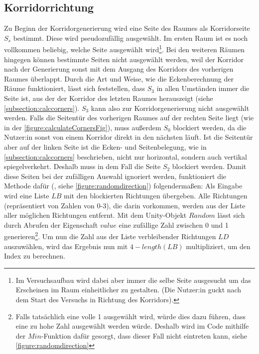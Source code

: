 \subsection{Korridorrichtung}

\begin{figure}[h!]
    \caption{}\label{figure:randomdirection}
\end{figure}
Zu Beginn der Korridorgenerierung wird eine Seite des Raumes als Korridorseite $S_s$ bestimmt. Diese wird pseudozufällig ausgewählt. Im ersten Raum ist es noch vollkommen beliebig, welche Seite ausgewählt wird\footnote{Im Versuchsaufbau wird dabei aber immer die selbe Seite ausgesucht um das Erscheinen im Raum einheitlicher zu gestalten. (Die Nutzer:in guckt nach dem Start des Versuchs in Richtung des Korridors).}.
Bei den weiteren Räumen hingegen können bestimmte Seiten nicht ausgewählt werden, weil der Korridor nach der Generierung sonst mit dem Ausgang des Korridors des vorherigen Raumes überlappt.
Durch die Art und Weise, wie die Eckenberechnung der Räume funktioniert, lässt sich feststellen, dass $S_3$ in allen Umständen immer die Seite ist, aus der der Korridor des letzten Raumes herauszeigt (siehe \autoref{subsection:calccorners}). $S_3$ kann also zur Korridorgenerierung nicht ausgewählt werden.
Falls die Seitentür des vorherigen Raumes auf der rechten Seite liegt (wie in der \autoref{figure:calculateCornersFig}), muss außerdem $S_0$ blockiert werden, da die Nutzer:in sonst von einem Korridor direkt in den nächsten läuft. Ist die Seitentür aber auf der linken Seite ist die Ecken- und Seitenbelegung, wie in \autoref{subsection:calccorners} beschrieben, nicht nur horizontal, sondern auch vertikal spiegelverkehrt. Deshalb muss in dem Fall die Seite $S_2$ blockiert werden.
Damit diese Seiten bei der zufälligen Auswahl ignoriert werden, funktioniert die Methode dafür (, siehe \autoref{figure:randomdirection})
folgendermaßen: Als Eingabe wird eine Liste $LB$ mit den blockierten Richtungen übergeben. Alle Richtungen (repräsentiert von Zahlen von 0-3), die darin vorkommen, werden aus der Liste aller möglichen Richtungen entfernt.
Mit dem Unity-Objekt $Random$ lässt sich durch Abrufen der Eigenschaft $value$ eine zufällige Zahl zwischen 0 und 1 generieren\footnote{Falls tatsächlich eine volle 1 ausgewählt wird, würde dies dazu führen, dass eine zu hohe Zahl ausgewählt werden würde. Deshalb wird im Code mithilfe der $Min$-Funktion dafür gesorgt, dass dieser Fall nicht eintreten kann, siehe \autoref{figure:randomdirection}}.
Um nun die Zahl aus der Liste verbleibender Richtungen $LD$ auszuwählen, wird das Ergebnis nun mit $4 - length(LB)$ multipliziert, um den Index zu berechnen.

